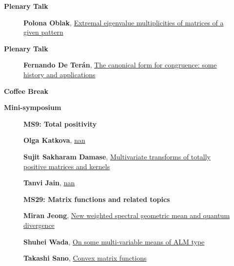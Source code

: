 \documentclass[ILAS2025-program.tex]{subfiles}
\begin{document}
    \begin{description}
    \item[] \textbf{Plenary Talk} 
    \begin{description}
        \item[] \hypertarget{up0002}{}\textbf{Polona Oblak}, \hyperlink{down0002}{Extremal eigenvalue multiplicities of matrices of a given pattern
}
        \end{description}
        \item[] \textbf{Plenary Talk} 
    \begin{description}
        \item[] \hypertarget{up0003}{}\textbf{Fernando De Terán}, \hyperlink{down0003}{The canonical form for congruence: some history and applications}
        \end{description}
        \item[] \textbf{Coffee Break} 
    \item[] \textbf{Mini-symposium} 
    \begin{description}
    \item[] {\color{mstitle}\textbf{MS9: Total positivity}} 
    \item[] \hypertarget{up0120}{}\textbf{Olga Katkova}, \hyperlink{down0120}{nan}
        \item[] \hypertarget{up0121}{}\textbf{Sujit Sakharam Damase}, \hyperlink{down0121}{Multivariate transforms of totally positive matrices and kernels
}
        \item[] \hypertarget{up0122}{}\textbf{Tanvi Jain}, \hyperlink{down0122}{nan}
        \end{description}
    \begin{description}
    \item[] {\color{mstitle}\textbf{MS29: Matrix functions and related topics}} 
    \item[] \hypertarget{up0123}{}\textbf{Miran Jeong}, \hyperlink{down0123}{New weighted spectral geometric mean and quantum divergence}
        \item[] \hypertarget{up0124}{}\textbf{Shuhei Wada}, \hyperlink{down0124}{On some multi-variable means of ALM type}
        \item[] \hypertarget{up0125}{}\textbf{Takashi Sano}, \hyperlink{down0125}{Convex matrix functions}

\end{description}
\end{description}
\end{document}
